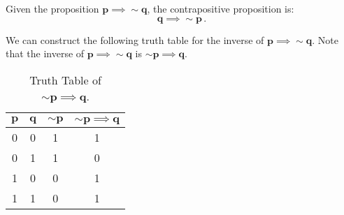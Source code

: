 %
%

\begin{subquestions}
	

\subquestion

Given the proposition $\boldsymbol{p \implies \sim q}$, the contrapositive proposition is:
\begin{equation}
	\boldsymbol{q \implies \sim p}\,. 
\end{equation}


\subquestion

We can construct the following truth table for the inverse of $\boldsymbol{p \implies \sim q}$. Note that the inverse of $\boldsymbol{p \implies \sim q}$ is $\boldsymbol{\sim p \implies q}$.
\begin{table}[ht]
	\centering
	\begin{tabular}{|c|c|c|c|}
		\hline
		$\boldsymbol{p}$ & $\boldsymbol{q}$ & $\boldsymbol{\sim p}$ & $\boldsymbol{\sim p \implies q}$ \\
		\hline
		0 & 0 & 1 & 1 \\
		0 & 1 & 1 & 0 \\
		1 & 0 & 0 & 1 \\
		1 & 1 & 0 & 1 \\
		\hline
	\end{tabular}
	\caption{\label{2014:q1:tab:Tab1} Truth Table of $\boldsymbol{\sim p \implies q}$.}
\end{table}
		
		

\end{subquestions}
